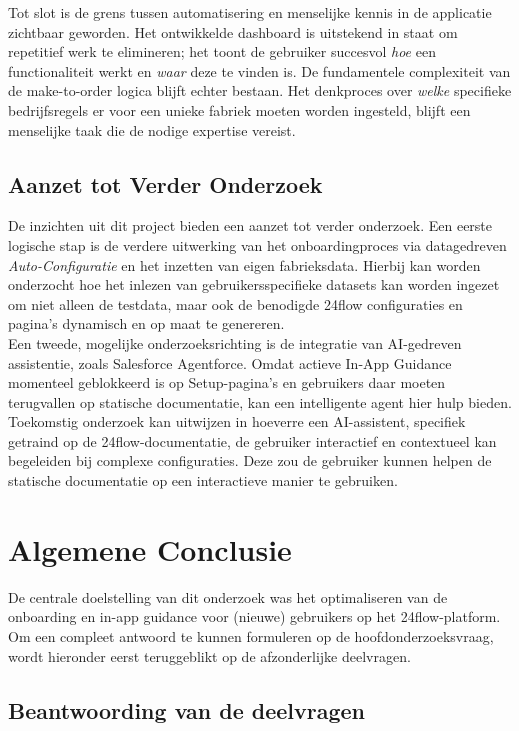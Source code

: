 Tot slot is de grens tussen automatisering en menselijke kennis in de applicatie zichtbaar geworden. Het ontwikkelde dashboard is uitstekend in staat om repetitief werk te elimineren; het toont de gebruiker succesvol \textit{hoe} een functionaliteit werkt en \textit{waar} deze te vinden is. De fundamentele complexiteit van de make-to-order logica blijft echter bestaan. Het denkproces over \textit{welke} specifieke bedrijfsregels er voor een unieke fabriek moeten worden ingesteld, blijft een menselijke taak die de nodige expertise vereist.

\subsection{Aanzet tot Verder Onderzoek}
De inzichten uit dit project bieden een aanzet tot verder onderzoek. Een eerste logische stap is de verdere uitwerking van het onboardingproces via datagedreven \textit{Auto-Configuratie} en het inzetten van eigen fabrieksdata. Hierbij kan worden onderzocht hoe het inlezen van gebruikersspecifieke datasets kan worden ingezet om niet alleen de testdata, maar ook de benodigde 24flow configuraties en pagina's dynamisch en op maat te genereren.
\\

Een tweede, mogelijke onderzoeksrichting is de integratie van AI-gedreven assistentie, zoals Salesforce Agentforce. Omdat actieve In-App Guidance momenteel geblokkeerd is op Setup-pagina's en gebruikers daar moeten terugvallen op statische documentatie, kan een intelligente agent hier hulp bieden. Toekomstig onderzoek kan uitwijzen in hoeverre een AI-assistent, specifiek getraind op de 24flow-documentatie, de gebruiker interactief en contextueel kan begeleiden bij complexe configuraties. Deze zou de gebruiker kunnen helpen de statische documentatie op een interactieve manier te gebruiken.


\section{Algemene Conclusie}%
\label{sec:conclusie}

De centrale doelstelling van dit onderzoek was het optimaliseren van de onboarding en in-app guidance voor (nieuwe) gebruikers op het 24flow-platform. Om een compleet antwoord te kunnen formuleren op de hoofdonderzoeksvraag, wordt hieronder eerst teruggeblikt op de afzonderlijke deelvragen.

\subsection{Beantwoording van de deelvragen}

